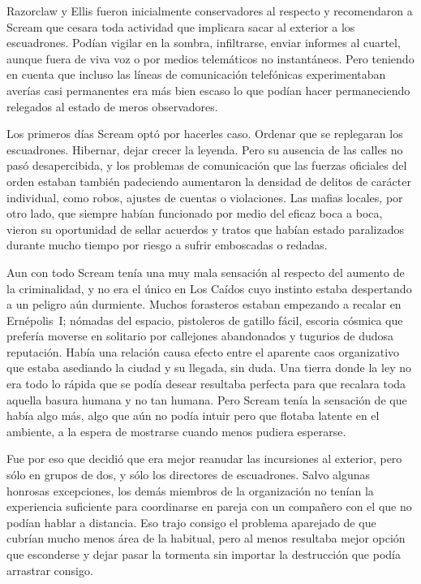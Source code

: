 Razorclaw y Ellis fueron inicialmente conservadores al respecto y recomendaron a Scream que cesara toda actividad que implicara sacar al exterior a los escuadrones. Podían vigilar en la sombra, infiltrarse, enviar informes al cuartel, aunque fuera de viva voz o por medios telemáticos no instantáneos. Pero teniendo en cuenta que incluso las líneas de comunicación telefónicas experimentaban averías casi permanentes era más bien escaso lo que podían hacer permaneciendo relegados al estado de meros observadores.

Los primeros días Scream optó por hacerles caso. Ordenar que se replegaran los escuadrones. Hibernar, dejar crecer la leyenda. Pero su ausencia de las calles no pasó desapercibida, y los problemas de comunicación que las fuerzas oficiales del orden estaban también padeciendo aumentaron la densidad de delitos de carácter individual, como robos, ajustes de cuentas o violaciones. Las mafias locales, por otro lado, que siempre habían funcionado por medio del eficaz boca a boca, vieron su oportunidad de sellar acuerdos y tratos que habían estado paralizados durante mucho tiempo por riesgo a sufrir emboscadas o redadas.

Aun con todo Scream tenía una muy mala sensación al respecto del aumento de la criminalidad, y no era el único en Los Caídos cuyo instinto estaba despertando a un peligro aún durmiente. Muchos forasteros estaban empezando a recalar en Ernépolis~I; nómadas del espacio, pistoleros de gatillo fácil, escoria cósmica que prefería moverse en solitario por callejones abandonados y tugurios de dudosa reputación. Había una relación causa efecto entre el aparente caos organizativo que estaba asediando la ciudad y su llegada, sin duda. Una tierra donde la ley no era todo lo rápida que se podía desear resultaba perfecta para que recalara toda aquella basura humana y no tan humana. Pero Scream tenía la sensación de que había algo más, algo que aún no podía intuir pero que flotaba latente en el ambiente, a la espera de mostrarse cuando menos pudiera esperarse.

Fue por eso que decidió que era mejor reanudar las incursiones al exterior, pero sólo en grupos de dos, y sólo los directores de escuadrones. Salvo algunas honrosas excepciones, los demás miembros de la organización no tenían la experiencia suficiente para coordinarse en pareja con un compañero con el que no podían hablar a distancia. Eso trajo consigo el problema aparejado de que cubrían mucho menos área de la habitual, pero al menos resultaba mejor opción que esconderse y dejar pasar la tormenta sin importar la destrucción que podía arrastrar consigo.

